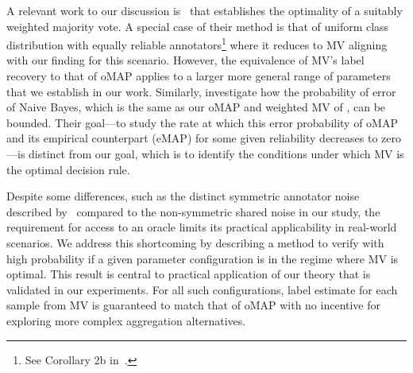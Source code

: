 

A relevant work to our discussion is~\citet{nitzan1981characterization} that establishes the optimality of a suitably weighted majority vote.
A special case of their method is that of uniform class distribution with equally reliable annotators\footnote{See Corollary 2b in~\citep{nitzan1981characterization}.} where it reduces to MV aligning with our finding for this scenario.
However, the equivalence of MV's label recovery to that of oMAP applies to a larger more general range of parameters that we establish in our work. Similarly, \citet{berend2015finite} investigate how the probability of error of Naive Bayes, which is the same as our oMAP and weighted MV of \citet{nitzan1981characterization}, can be bounded. Their goal—to study the rate at which this error probability of oMAP and its empirical counterpart (eMAP) for some given reliability decreases to zero—is distinct from our goal, which is to identify the conditions under which MV is the optimal decision rule. 

Despite some differences, such as the distinct symmetric annotator noise described by~\citet{nitzan1981characterization} compared to the non-symmetric shared noise in our study, the requirement for access to an oracle limits its practical applicability in real-world scenarios. We address this shortcoming by describing a method to verify with high probability if a given parameter configuration is in the regime where MV is optimal.
This result is central to practical application of our theory that is validated in our experiments.
For all such configurations, label estimate for each sample from MV is guaranteed to match that of oMAP with no incentive for exploring more complex aggregation alternatives.